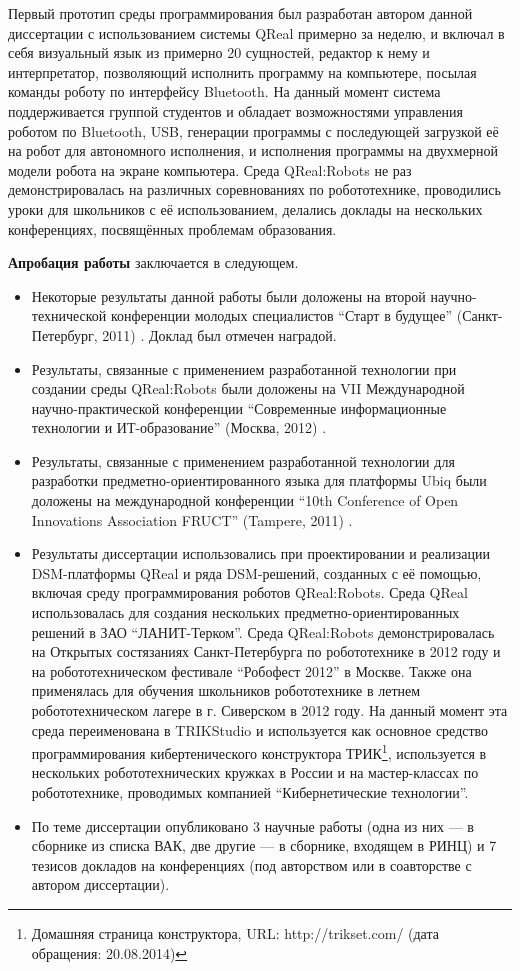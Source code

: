 Первый прототип среды программирования был разработан автором данной диссертации
с использованием системы QReal примерно за неделю, и включал в себя визуальный 
язык из примерно 20 сущностей, редактор к нему и интерпретатор, позволяющий 
исполнить программу на компьютере, посылая команды роботу по интерфейсу 
\ac{Bluetooth}. На данный момент система поддерживается группой студентов и обладает 
возможностями управления роботом по \ac{Bluetooth}, \ac{USB}, генерации программы с 
последующей загрузкой её на робот для автономного исполнения, и исполнения 
программы на двухмерной модели робота на экране компьютера. Среда QReal:Robots 
не раз демонстрировалась на различных соревнованиях по робототехнике, 
проводились уроки для школьников с её использованием, делались доклады на 
нескольких конференциях, посвящённых проблемам образования.

\textbf{Апробация работы} заключается в следующем.
\begin{itemize}
	\item Некоторые результаты данной работы были доложены на второй 
		научно-технической конференции молодых специалистов "`Старт в будущее"' 
		(Санкт-Петербург, 2011) \cite{kuzenkova2011metamodeling}. Доклад был 
		отмечен наградой.
	\item Результаты, связанные с применением разработанной технологии при 
		создании среды QReal:Robots были доложены на VII Международной 
		научно-практической конференции "`Современные информационные технологии 
		и ИТ-образование"' (Москва, 2012) \cite{litvinov2012robots}.
	\item Результаты, связанные с применением разработанной технологии для 
		разработки предметно-ориентированного языка для платформы Ubiq были доложены 
		на международной конференции "`10th Conference of Open Innovations 
		Association FRUCT"' (Tampere, 2011) \cite{bryksin2011ubiq}.
	\item Результаты диссертации использовались  при проектировании и реализации 
		DSM-платформы QReal и ряда DSM-решений, созданных с её помощью, включая 
		среду программирования роботов QReal:Robots. Среда QReal использовалась для 
		создания нескольких предметно-ориентированных решений в ЗАО “ЛАНИТ-Терком”. 
		Среда QReal:Robots демонстрировалась на Открытых состязаниях 
		Санкт-Петербурга по робототехнике в 2012 году и на робототехническом 
		фестивале "`Робофест 2012"' в Москве. Также она применялась для обучения 
		школьников робототехнике в летнем робототехническом лагере в 
		г. Сиверском в 2012 году. На данный момент эта среда переименована в 
		TRIKStudio и используется как основное средство программирования 
		кибертенического конструктора 
		ТРИК\footnote{Домашняя страница конструктора, URL: http://trikset.com/ (дата обращения: 20.08.2014)},
		используется в нескольких робототехнических кружках в России и на мастер-классах
		по робототехнике, проводимых компанией "`Кибернетические технологии"'.
	\item По теме диссертации опубликовано 3 научные работы (одна из них ---
		в сборнике из списка ВАК, две другие --- в сборнике, входящем в РИНЦ) и 
		7 тезисов докладов на конференциях (под авторством или в соавторстве с 
		автором диссертации).
\end{itemize}

